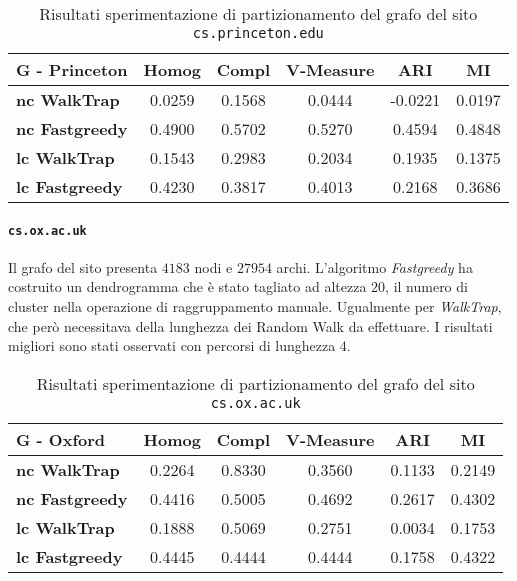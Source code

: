 \begin{table}[H]
	\begin{tabular}{| l | c | c | c | c | c |}
	\hline
	\textbf{G - Princeton}  & \textbf{Homog} & \textbf{Compl} & \textbf{V-Measure}  & \textbf{ARI}  & \textbf{MI} \\ [3ex] \hline
	\textbf{nc WalkTrap} & 0.0259 & 0.1568 & 0.0444 & -0.0221 & 0.0197\\ [3ex]
	 \hline
	\textbf{nc Fastgreedy} & 0.4900 & 0.5702 & 0.5270 & 0.4594 & 0.4848\\ [3ex]
	 \hline	
	\textbf{lc WalkTrap} & 0.1543 & 0.2983 & 0.2034 & 0.1935 & 0.1375\\ [3ex]
	 \hline	
	\textbf{lc Fastgreedy} & 0.4230 & 0.3817 & 0.4013 & 0.2168 & 0.3686\\ [3ex]
	\hline
	\end{tabular}
	\caption{Risultati sperimentazione di partizionamento del grafo del sito \texttt{cs.princeton.edu}}
	\label{metricheGraphPrinc}
\end{table}

\paragraph{\texttt{cs.ox.ac.uk}} Il grafo del sito presenta $4183$ nodi e $27954$ archi. L'algoritmo \textit{Fastgreedy} ha costruito un dendrogramma che è stato tagliato ad altezza $20$, il numero di cluster nella operazione di raggruppamento manuale. Ugualmente per \textit{WalkTrap}, che però necessitava della lunghezza dei Random Walk da effettuare. I risultati migliori sono stati osservati con percorsi di lunghezza $4$.

\begin{table}[H]
	\begin{tabular}{| l | c | c | c | c | c |}
	\hline
	\textbf{G - Oxford}  & \textbf{Homog} & \textbf{Compl} & \textbf{V-Measure}  & \textbf{ARI}  & \textbf{MI} \\ [3ex] \hline
	\textbf{nc WalkTrap} & 0.2264 & 0.8330 & 0.3560 & 0.1133 & 0.2149 \\ [3ex]
	 \hline
	\textbf{nc Fastgreedy} & 0.4416 & 0.5005 & 0.4692 & 0.2617 & 0.4302 \\ [3ex]
	 \hline	
	\textbf{lc WalkTrap} & 0.1888 & 0.5069 & 0.2751 & 0.0034 & 0.1753 \\ [3ex]
	 \hline	
	\textbf{lc Fastgreedy} & 0.4445 & 0.4444 & 0.4444 & 0.1758 & 0.4322 \\ [3ex]
	\hline
	\end{tabular}
	\caption{Risultati sperimentazione di partizionamento del grafo del sito \texttt{cs.ox.ac.uk}}
	\label{metricheGraphOx}
\end{table}


